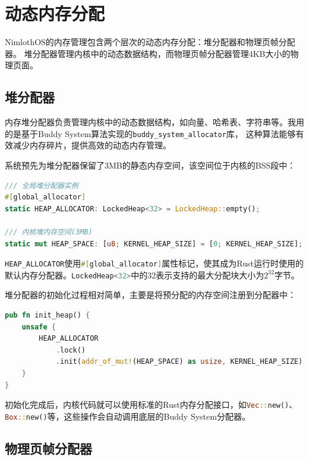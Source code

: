 \section{动态内存分配}

NimlothOS的内存管理包含两个层次的动态内存分配：堆分配器和物理页帧分配器。
堆分配器管理内核中的动态数据结构，而物理页帧分配器管理4KB大小的物理页面。

\subsection{堆分配器}

内存堆分配器负责管理内核中的动态数据结构，如向量、哈希表、字符串等。我用的是基于Buddy System算法实现的\lstinline[language=Rust]{buddy_system_allocator}库，
这种算法能够有效减少内存碎片，提供高效的动态内存管理。

系统预先为堆分配器保留了3MB的静态内存空间，该空间位于内核的BSS段中：

\begin{lstlisting}[language=Rust,caption={堆分配器声明}, label={lst:heap-decl}]
/// 全局堆分配器实例
#[global_allocator]
static HEAP_ALLOCATOR: LockedHeap<32> = LockedHeap::empty();

/// 内核堆内存空间(3MB)
static mut HEAP_SPACE: [u8; KERNEL_HEAP_SIZE] = [0; KERNEL_HEAP_SIZE];
\end{lstlisting}

\lstinline[language=Rust]{HEAP_ALLOCATOR}使用\lstinline[language=Rust]{#[global_allocator]}属性标记，使其成为Rust运行时使用的默认内存分配器。\lstinline[language=Rust]{LockedHeap<32>}中的32表示支持的最大分配块大小为$2^{32}$字节。

堆分配器的初始化过程相对简单，主要是将预分配的内存空间注册到分配器中：

\begin{lstlisting}[language=Rust,caption={堆分配器初始化}, label={lst:heap-init-func}]
pub fn init_heap() {
    unsafe {
        HEAP_ALLOCATOR
            .lock()
            .init(addr_of_mut!(HEAP_SPACE) as usize, KERNEL_HEAP_SIZE);
    }
}
\end{lstlisting}

初始化完成后，内核代码就可以使用标准的Rust内存分配接口，如\lstinline[language=Rust]{Vec::new()}、\lstinline[language=Rust]{Box::new()}等，这些操作会自动调用底层的Buddy System分配器。

\subsection{物理页帧分配器}

